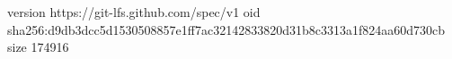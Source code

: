 version https://git-lfs.github.com/spec/v1
oid sha256:d9db3dcc5d1530508857e1ff7ac32142833820d31b8c3313a1f824aa60d730cb
size 174916
